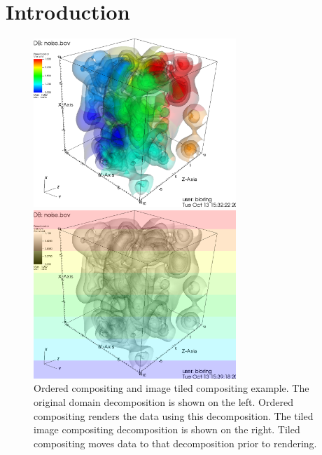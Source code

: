 \documentclass[a4paper,10pt]{report}
\begin{document}
\section{Introduction}
\begin{figure}
\centering
\begin{minipage}{0.48\textwidth}
\begin{center}
\includegraphics[height=2.5in]{./order_composite_example_color.png}
\end{center}
\end{minipage}
\begin{minipage}{0.48\textwidth}
\begin{center}
\includegraphics[height=2.5in]{./tiled_image_example_color.png}
\end{center}
\end{minipage}
\begin{minipage}{0.55\textwidth} 
\caption{\footnotesize Ordered compositing and image tiled compositing example. The original domain decomposition is shown on the left. Ordered compositing renders the data using this decomposition. The tiled image compositing decomposition is shown on the right. Tiled compositing moves data to that decomposition prior to rendering.}
\label{fig:example}
\end{minipage}\hspace{0.04in}

\end{figure}
\end{document}
